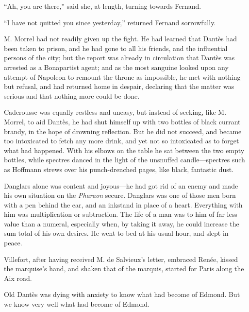 “Ah, you are there,” said she, at length, turning towards Fernand.

“I have not quitted you since yesterday,” returned Fernand sorrowfully.

M. Morrel had not readily given up the fight. He had learned that
Dantès had been taken to prison, and he had gone to all his friends,
and the influential persons of the city; but the report was already in
circulation that Dantès was arrested as a Bonapartist agent; and as the
most sanguine looked upon any attempt of Napoleon to remount the throne
as impossible, he met with nothing but refusal, and had returned home
in despair, declaring that the matter was serious and that nothing more
could be done.

Caderousse was equally restless and uneasy, but instead of seeking,
like M. Morrel, to aid Dantès, he had shut himself up with two bottles
of black currant brandy, in the hope of drowning reflection. But he did
not succeed, and became too intoxicated to fetch any more drink, and
yet not so intoxicated as to forget what had happened. With his elbows
on the table he sat between the two empty bottles, while spectres
danced in the light of the unsnuffed candle—spectres such as Hoffmann
strews over his punch-drenched pages, like black, fantastic dust.

Danglars alone was content and joyous—he had got rid of an enemy and
made his own situation on the \textit{Pharaon} secure. Danglars was one of
those men born with a pen behind the ear, and an inkstand in place of a
heart. Everything with him was multiplication or subtraction. The life
of a man was to him of far less value than a numeral, especially when,
by taking it away, he could increase the sum total of his own desires.
He went to bed at his usual hour, and slept in peace.

Villefort, after having received M. de Salvieux’s letter, embraced
Renée, kissed the marquise’s hand, and shaken that of the marquis,
started for Paris along the Aix road.

Old Dantès was dying with anxiety to know what had become of Edmond.
But we know very well what had become of Edmond.
